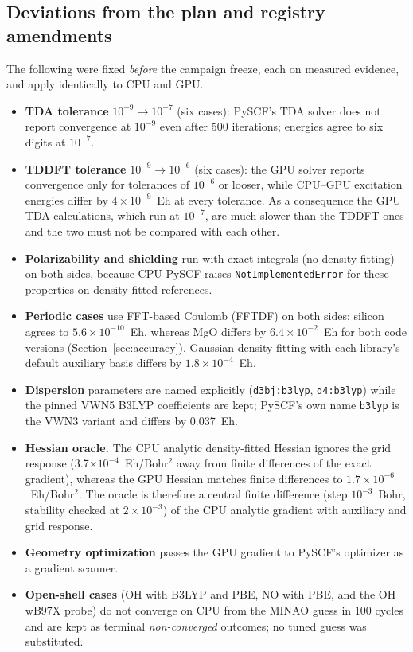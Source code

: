 \subsection{Deviations from the plan and registry amendments}
\label{sec:deviations}

The following were fixed \emph{before} the campaign freeze, each on measured evidence, and apply identically to CPU and GPU.

\begin{itemize}[leftmargin=*,itemsep=1pt]
\item \textbf{TDA tolerance} $10^{-9}\to10^{-7}$ (six cases): PySCF's TDA solver does not report convergence at $10^{-9}$ even after 500 iterations; energies agree to six digits at $10^{-7}$.
\item \textbf{TDDFT tolerance} $10^{-9}\to10^{-6}$ (six cases): the GPU solver reports convergence only for tolerances of $10^{-6}$ or looser, while CPU--GPU excitation energies differ by $4\times10^{-9}$~Eh at every tolerance. As a consequence the GPU TDA calculations, which run at $10^{-7}$, are much slower than the TDDFT ones and the two must not be compared with each other.
\item \textbf{Polarizability and shielding} run with exact integrals (no density fitting) on both sides, because CPU PySCF raises \texttt{NotImplementedError} for these properties on density-fitted references.
\item \textbf{Periodic cases} use FFT-based Coulomb (FFTDF) on both sides; silicon agrees to $5.6\times10^{-10}$~Eh, whereas MgO differs by $6.4\times10^{-2}$~Eh for both code versions (Section~\ref{sec:accuracy}). Gaussian density fitting with each library's default auxiliary basis differs by $1.8\times10^{-4}$~Eh.
\item \textbf{Dispersion} parameters are named explicitly (\texttt{d3bj:b3lyp}, \texttt{d4:b3lyp}) while the pinned VWN5 B3LYP coefficients are kept; PySCF's own name \texttt{b3lyp} is the VWN3 variant and differs by 0.037~Eh.
\item \textbf{Hessian oracle.} The CPU analytic density-fitted Hessian ignores the grid response (3.7$\times10^{-4}$~Eh/Bohr$^2$ away from finite differences of the exact gradient), whereas the GPU Hessian matches finite differences to $1.7\times10^{-6}$~Eh/Bohr$^2$. The oracle is therefore a central finite difference (step $10^{-3}$~Bohr, stability checked at $2\times10^{-3}$) of the CPU analytic gradient with auxiliary and grid response.
\item \textbf{Geometry optimization} passes the GPU gradient to PySCF's optimizer as a gradient scanner.
\item \textbf{Open-shell cases} (OH with B3LYP and PBE, NO with PBE, and the OH wB97X probe) do not converge on CPU from the MINAO guess in 100 cycles and are kept as terminal \emph{non-converged} outcomes; no tuned guess was substituted.
\end{itemize}

